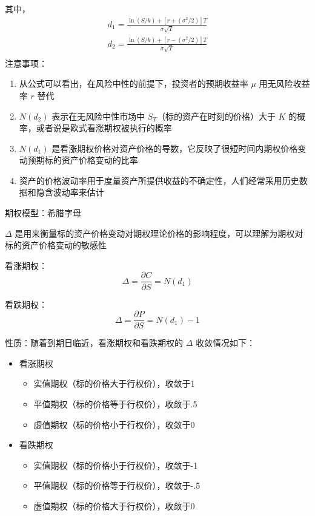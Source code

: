 \documentclass{article}
\begin{document}
其中，
\begin{equation}
    \begin{aligned}
        d_1=\frac{\ln(S/k)+[r+(\sigma^2/2)]T}{\sigma \sqrt{T}}\\
        d_2=\frac{\ln(S/k)+[r-(\sigma^2/2)]T}{\sigma \sqrt{T}}\\
    \end{aligned}
\end{equation}
注意事项：
\begin{enumerate}
    \item 从公式可以看出，在风险中性的前提下，投资者的预期收益率 $\mu$ 用无风险收益率 $r$ 替代
    \item $N(d_2)$ 表示在无风险中性市场中 $S_T$（标的资产在时刻的价格）大于 $K$ 的概率，或者说是欧式看涨期权被执行的概率
    \item $N(d_1)$ 是看涨期权价格对资产价格的导数，它反映了很短时间内期权价格变动预期标的资产价格变动的比率
    \item 资产的价格波动率用于度量资产所提供收益的不确定性，人们经常采用历史数据和隐含波动率来估计
\end{enumerate}
期权模型：希腊字母

$\Delta$ 是用来衡量标的资产价格变动对期权理论价格的影响程度，可以理解为期权对标的资产价格变动的敏感性

看涨期权：
$$\Delta=\frac{\partial C}{\partial S}=N(d_1)$$

看跌期权：
$$\Delta=\frac{\partial P}{\partial S}=N(d_1)-1$$

性质：随着到期日临近，看涨期权和看跌期权的 $\Delta$ 收敛情况如下：
\begin{itemize}
    \item 看涨期权
    \begin{itemize}
        \item 实值期权（标的价格大于行权价），收敛于1
        \item 平值期权（标的价格等于行权价），收敛于.5
        \item 虚值期权（标的价格小于行权价），收敛于0
    \end{itemize}
    \item 看跌期权
    \begin{itemize}
        \item 实值期权（标的价格小于行权价），收敛于-1
        \item 平值期权（标的价格等于行权价），收敛于-.5
        \item 虚值期权（标的价格大于行权价），收敛于0
    \end{itemize}
\end{itemize}
\end{document}
